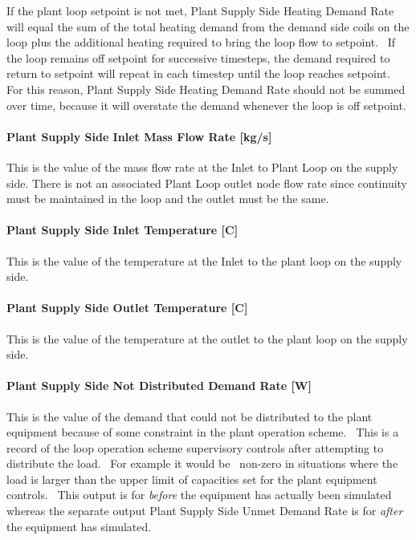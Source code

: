 If the plant loop setpoint is not met, Plant Supply Side Heating Demand Rate will equal the sum of the total heating demand from the demand side coils on the loop plus the additional heating required to bring the loop flow to setpoint.~ If the loop remains off setpoint for successive timesteps, the demand required to return to setpoint will repeat in each timestep until the loop reaches setpoint.~ For this reason, Plant Supply Side Heating Demand Rate should not be summed over time, because it will overstate the demand whenever the loop is off setpoint.

\paragraph{Plant Supply Side Inlet Mass Flow Rate {[}kg/s{]}}\label{plant-supply-side-inlet-mass-flow-rate-kgs}

This is the value of the mass flow rate at the Inlet to Plant Loop on the supply side. There is not an associated Plant Loop outlet node flow rate since continuity must be maintained in the loop and the outlet must be the same.

\paragraph{Plant Supply Side Inlet Temperature {[}C{]}}\label{plant-supply-side-inlet-temperature-c}

This is the value of the temperature at the Inlet to the plant loop on the supply side.

\paragraph{Plant Supply Side Outlet Temperature {[}C{]}}\label{plant-supply-side-outlet-temperature-c}

This is the value of the temperature at the outlet to the plant loop on the supply side.

\paragraph{Plant Supply Side Not Distributed Demand Rate {[}W{]}}\label{plant-supply-side-not-distributed-demand-rate-w}

This is the value of the demand that could not be distributed to the plant equipment because of some constraint in the plant operation scheme.~ This is a record of the loop operation scheme supervisory controls after attempting to distribute the load.~ For example it would be~ non-zero in situations where the load is larger than the upper limit of capacities set for the plant equipment controls.~ This output is for \emph{before} the equipment has actually been simulated whereas the separate output Plant Supply Side Unmet Demand Rate is for \emph{after} the equipment has simulated.

